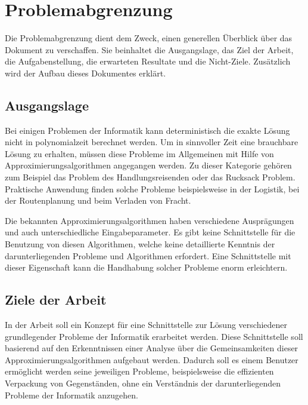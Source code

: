 %
%

\chapter{Problemabgrenzung}\label{chap.projektuebersicht}
Die Problemabgrenzung dient dem Zweck, einen generellen Überblick über das Dokument zu verschaffen. Sie beinhaltet die Ausgangslage, das Ziel der Arbeit, die Aufgabenstellung, die erwarteten 
Resultate und die Nicht-Ziele. Zusätzlich wird der Aufbau dieses Dokumentes erklärt.

\section{Ausgangslage}\label{ausganglage}
Bei einigen Problemen der Informatik kann deterministisch die exakte Lösung nicht in \gls{polynomialzeit} berechnet werden. Um in sinnvoller Zeit eine brauchbare Lösung zu erhalten, müssen diese 
Probleme im Allgemeinen mit Hilfe von Approximierungsalgorithmen angegangen werden. Zu dieser Kategorie gehören zum Beispiel das Problem des Handlungsreisenden oder das Rucksack 
Problem. Praktische Anwendung finden solche Probleme beispielsweise in der Logistik, bei der Routenplanung und beim Verladen von Fracht.

Die bekannten Approximierungsalgorithmen haben verschiedene Ausprägungen und auch unterschiedliche Eingabeparameter. Es gibt keine Schnittstelle für die Benutzung von diesen 
Algorithmen, welche keine detaillierte Kenntnis der darunterliegenden Probleme und Algorithmen erfordert. Eine Schnittstelle mit dieser Eigenschaft kann die Handhabung solcher Probleme 
enorm erleichtern.

\section{Ziele der Arbeit}\label{ziele}
In der Arbeit soll ein Konzept für eine Schnittstelle zur Lösung verschiedener grundlegender Probleme der Informatik erarbeitet werden. Diese Schnittstelle soll basierend auf den Erkenntnissen 
einer Analyse über die Gemeinsamkeiten dieser Approximierungsalgorithmen aufgebaut werden. Dadurch soll es einem Benutzer ermöglicht werden seine jeweiligen Probleme, beispielsweise die 
effizienten Verpackung von Gegenständen, ohne ein Verständnis der darunterliegenden Probleme der Informatik anzugehen.

